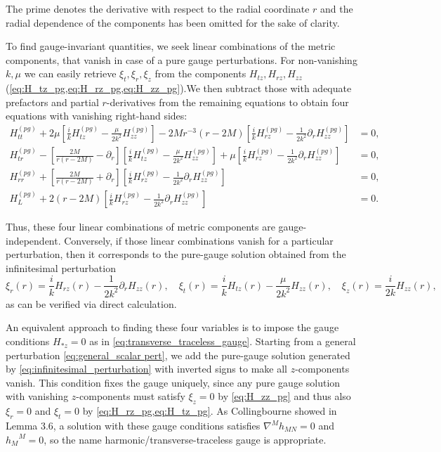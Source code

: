 \documentclass[11pt,aip,jmp,amsmath,amssymb,draft]{revtex4-1}
\begin{document}
The prime denotes the derivative with respect to the radial coordinate $r$ and the radial dependence of the components has been omitted for the sake of clarity.

To find gauge-invariant quantities, we seek linear combinations of the metric components, that vanish in case of a pure gauge perturbations.
For non-vanishing $k,\mu$ we can easily retrieve $\xi_t, \xi_r, \xi_z$ from the components $H_{tz}, H_{rz}, H_{zz}$ (\cref{eq:H_tz_pg,eq:H_rz_pg,eq:H_zz_pg}).We then subtract those with adequate prefactors and partial $r$-derivatives from the remaining equations to obtain four equations with vanishing right-hand sides:
\begin{align}
    H_{tt}^{(pg)}  + 2 \mu \left[\frac{i}{k} H_{tz}^{(pg)} - \frac{\mu}{2k^2}H_{zz}^{(pg)}\right] - 2 M r^{-3}(r-2 M) \left[\frac{i}{k} H_{rz}^{(pg)} - \frac{1}{2k^2} \partial_r H_{zz}^{(pg)}\right] &= 0, \label{eq:gi1} \\
    H_{tr}^{(pg)}  - \left[\frac{2 M }{r (r - 2M)} - \partial_r\right] \left[\frac{i}{k} H_{tz}^{(pg)} - \frac{\mu}{2k^2}H_{zz}^{(pg)}\right] + \mu \left[\frac{i}{k} H_{rz}^{(pg)} - \frac{1}{2k^2} \partial_r H_{zz}^{(pg)}\right] &= 0,\label{eq:gi2} \\
   H_{rr}^{(pg)} + \left[\frac{2 M }{r (r - 2M)} + \partial_r\right] \left[\frac{i}{k} H_{rz}^{(pg)} - \frac{1}{2k^2} \partial_r H_{zz}^{(pg)}\right] &= 0,\label{eq:gi3}  \\
    H_L^{(pg)} + 2 (r - 2M) \left[\frac{i}{k} H_{rz}^{(pg)} - \frac{1}{2k^2} \partial_r H_{zz}^{(pg)}\right] &= 0.\label{eq:gi4}
\end{align}

Thus, these four linear combinations of metric components are gauge-independent. Conversely, if those linear combinations vanish for a particular perturbation, then it corresponds to the pure-gauge solution obtained from the infinitesimal perturbation
\begin{equation} \label{eq:infinitesimal_perturbation}
    \xi_r(r) = \frac{i}{k} H_{rz}(r) - \frac{1}{2k^2} \partial_rH_{zz}(r),\quad \xi_t(r) = \frac{i}{k} H_{tz}(r) - \frac{\mu}{2k^2}H_{zz}(r),\quad \xi_z(r) = \frac{i}{2k}H_{zz}(r),
\end{equation}
as can be verified via direct calculation.

An equivalent approach to finding these four variables is to impose the gauge conditions  $H_{*z} = 0$ as in \cref{eq:transverse_traceless_gauge}. Starting from a general perturbation \cref{eq:general_scalar pert}, we add the pure-gauge solution generated by \cref{eq:infinitesimal_perturbation} with inverted signs to make all $z$-components vanish. 
This condition fixes the gauge uniquely, since any pure gauge solution with vanishing $z$-components must satisfy $\xi_z = 0$ by \cref{eq:H_zz_pg} and thus also $\xi_r = 0$ and $\xi_t = 0$ by \cref{eq:H_rz_pg,eq:H_tz_pg}. As Collingbourne \cite{collingbourne2021gregory} showed in Lemma 3.6, a solution with these gauge conditions satisfies $\nabla^M h_{MN} = 0$ and ${h_{M}}^{M} = 0$, so the name harmonic/transverse-traceless gauge is appropriate. 
\end{document}
